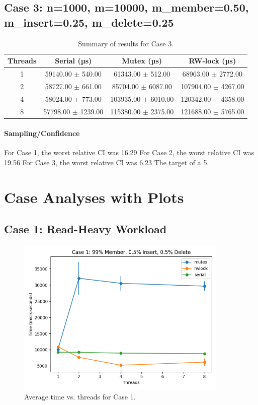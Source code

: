 \documentclass{article}
\begin{document}
\subsection*{Case 3: n=1000, m=10000, m\_member=0.50, m\_insert=0.25, m\_delete=0.25}
\begin{table}[h!]
\centering
\begin{tabular}{cccc}
\toprule
\textbf{Threads} & \textbf{Serial (µs)} & \textbf{Mutex (µs)} & \textbf{RW-lock (µs)} \\
\midrule
1 & 59140.00 $\pm$ 540.00 & 61343.00 $\pm$ 512.00 & 68963.00 $\pm$ 2772.00 \\
2 & 58727.00 $\pm$ 661.00 & 85704.00 $\pm$ 6087.00 & 107904.00 $\pm$ 4267.00 \\
4 & 58024.00 $\pm$ 773.00 & 103935.00 $\pm$ 6010.00 & 120342.00 $\pm$ 4358.00 \\
8 & 57798.00 $\pm$ 1239.00 & 115380.00 $\pm$ 2375.00 & 121688.00 $\pm$ 5765.00 \\
\bottomrule
\end{tabular}
\caption{Summary of results for Case 3.}
\label{tab:case3}
\end{table}
\paragraph{Sampling/Confidence}
For Case 1, the worst relative CI was 16.29%
For Case 2, the worst relative CI was 19.56%
For Case 3, the worst relative CI was 6.23%
The target of a 5%
\newpage
\section*{Case Analyses with Plots}
\subsection*{Case 1: Read-Heavy Workload}
\begin{figure}[h!]
\centering
\includegraphics[width=0.9\textwidth]{report/graphs/case1_plot.png}
\caption{Average time vs. threads for Case 1.}
\label{fig:case1}
\end{figure}
\end{document}
